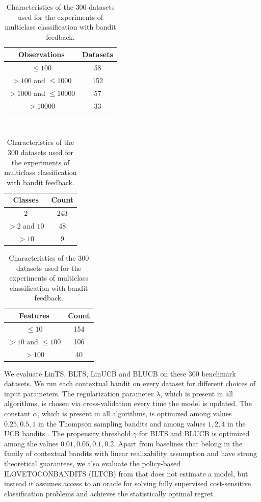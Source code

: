 \documentclass[letterpaper]{article} %
\begin{document}
\begin{table}[H]
\centering
\begin{tabular}{|c|c|}
\hline
Observations & Datasets \\
\hline 
$\leq 100$ & 58 \\
\hline
$> 100$ and $\leq 1000$  & 152  \\ 
\hline
$> 1000$ and $\leq 10000$ & 57  \\ 
\hline
$> 10000$ & 33 \\
\hline
\end{tabular}
\\ \vspace{5pt}
\begin{tabular}{|c|c|}
\hline
Classes & Count \\
\hline 	
$2$ & 243 \\
\hline
$> 2 \text{ and } 10$  & 48  \\ 
\hline
$ > 10 $ & 9  \\
\hline
\end{tabular}
\hspace{5pt}
\begin{tabular}{|c|c|}
\hline
Features & Count \\
\hline 	
$\leq 10$ & 154 \\
\hline
$> 10 \text{ and } \leq 100$  & 106  \\ 
\hline
$> 100$  & 40  \\
\hline
\end{tabular}
\caption{Characteristics of the 300 datasets used for the experiments of multiclass classification with bandit feedback.}
\label{stats}
\end{table}

We evaluate LinTS, BLTS, LinUCB and BLUCB on these 300 benchmark datasets. We run each contextual bandit on every dataset for different choices of input parameters. The regularization parameter $\lambda$, which is present in all algorithms, is chosen via cross-validation every time the model is updated. The constant $\alpha$, which is present in all algorithms, is optimized among values $0.25, 0.5, 1$ in the Thompson sampling bandits \cite{chapelle-tsucb} and among values $1, 2, 4$ in the UCB bandits \cite{chapelle-tsucb}. The propensity threshold $\gamma$ for BLTS and BLUCB is optimized among the values $0.01, 0.05, 0.1, 0.2$.
Apart from baselines that belong in the family of contextual bandits with linear realizability assumption and have strong theoretical guarantees, we also evaluate the policy-based ILOVETOCONBANDITS (ILTCB) from \cite{agarwal-ilovetoconbandits} that does not estimate a model, but instead it assumes access to an oracle for solving fully supervised cost-sensitive classification problems and achieves the statistically optimal regret.
\end{document}
